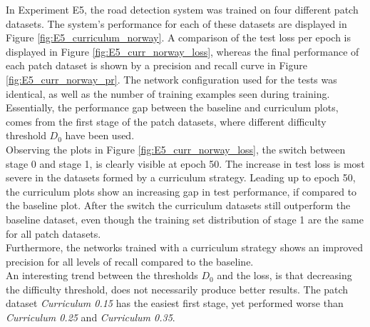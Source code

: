 In Experiment E5, the road detection system was trained on four different patch datasets. The system's performance for each of these datasets are displayed in Figure \ref{fig:E5_curriculum_norway}. A comparison of the test loss per epoch is displayed in Figure \ref{fig:E5_curr_norway_loss}, whereas the final performance of each patch dataset is shown by a precision and recall curve in Figure \ref{fig:E5_curr_norway_pr}. The network configuration used for the tests was identical, as well as the number of training examples seen during training. Essentially, the performance gap between the baseline and curriculum plots, comes from the first stage of the patch datasets, where different difficulty threshold $D_0$ have been used.\\

Observing the plots in Figure \ref{fig:E5_curr_norway_loss}, the switch between stage 0 and stage 1, is clearly visible at epoch 50. The increase in test loss is most severe in the datasets formed by a curriculum strategy. Leading up to epoch 50, the curriculum plots show an increasing gap in test performance, if compared to the baseline plot. After the switch the curriculum datasets still outperform the baseline dataset, even though the training set distribution of stage 1 are the same for all patch datasets.\\

Furthermore, the networks trained with a curriculum strategy shows an improved precision for all levels of recall compared to the baseline.\\

An interesting trend between the thresholds $D_0$ and the loss, is that decreasing the difficulty threshold, does not necessarily produce better results. The patch dataset \textit{Curriculum 0.15} has the easiest first stage, yet performed worse than \textit{Curriculum 0.25} and \textit{Curriculum 0.35}. \\



